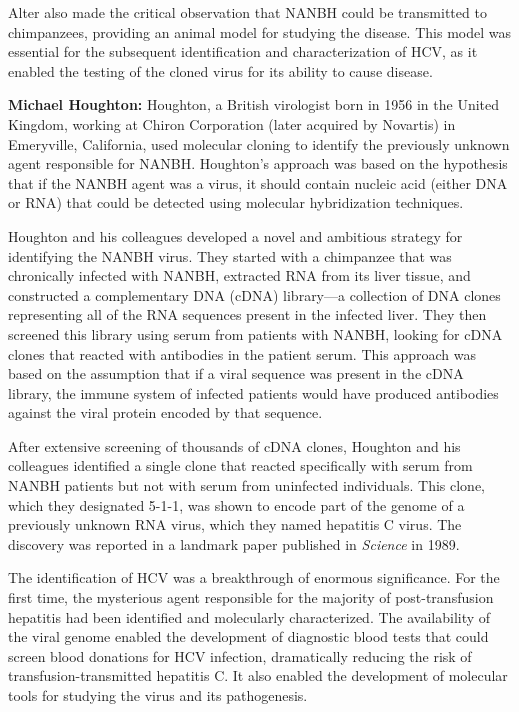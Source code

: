 Alter also made the critical observation that NANBH could be transmitted to chimpanzees, providing an animal model for studying the disease. This model was essential for the subsequent identification and characterization of HCV, as it enabled the testing of the cloned virus for its ability to cause disease.

\textbf{Michael Houghton:} Houghton, a British virologist born in 1956 in the United Kingdom, working at Chiron Corporation (later acquired by Novartis) in Emeryville, California, used molecular cloning to identify the previously unknown agent responsible for NANBH. Houghton's approach was based on the hypothesis that if the NANBH agent was a virus, it should contain nucleic acid (either DNA or RNA) that could be detected using molecular hybridization techniques.

Houghton and his colleagues developed a novel and ambitious strategy for identifying the NANBH virus. They started with a chimpanzee that was chronically infected with NANBH, extracted RNA from its liver tissue, and constructed a complementary DNA (cDNA) library---a collection of DNA clones representing all of the RNA sequences present in the infected liver. They then screened this library using serum from patients with NANBH, looking for cDNA clones that reacted with antibodies in the patient serum. This approach was based on the assumption that if a viral sequence was present in the cDNA library, the immune system of infected patients would have produced antibodies against the viral protein encoded by that sequence.

After extensive screening of thousands of cDNA clones, Houghton and his colleagues identified a single clone that reacted specifically with serum from NANBH patients but not with serum from uninfected individuals. This clone, which they designated 5-1-1, was shown to encode part of the genome of a previously unknown RNA virus, which they named hepatitis C virus. The discovery was reported in a landmark paper published in \textit{Science} in 1989.

The identification of HCV was a breakthrough of enormous significance. For the first time, the mysterious agent responsible for the majority of post-transfusion hepatitis had been identified and molecularly characterized. The availability of the viral genome enabled the development of diagnostic blood tests that could screen blood donations for HCV infection, dramatically reducing the risk of transfusion-transmitted hepatitis C. It also enabled the development of molecular tools for studying the virus and its pathogenesis.

